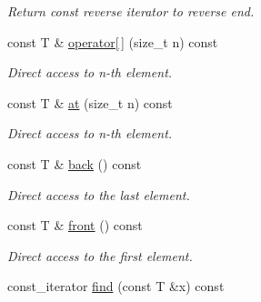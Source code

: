 \begin{DoxyCompactItemize}
\begin{DoxyCompactList}\small\item\em Return const reverse iterator to reverse end. \end{DoxyCompactList}\item 
\hypertarget{classmerlin_1_1set_a554ef509882e4d14cc0c8dd772eff7a9}{}const T \& \hyperlink{classmerlin_1_1set_a554ef509882e4d14cc0c8dd772eff7a9}{operator\mbox{[}$\,$\mbox{]}} (size\+\_\+t n) const \label{classmerlin_1_1set_a554ef509882e4d14cc0c8dd772eff7a9}

\begin{DoxyCompactList}\small\item\em Direct access to n-\/th element. \end{DoxyCompactList}\item 
\hypertarget{classmerlin_1_1set_af666381d39987a3a00787b0f1e7b9fb3}{}const T \& \hyperlink{classmerlin_1_1set_af666381d39987a3a00787b0f1e7b9fb3}{at} (size\+\_\+t n) const \label{classmerlin_1_1set_af666381d39987a3a00787b0f1e7b9fb3}

\begin{DoxyCompactList}\small\item\em Direct access to n-\/th element. \end{DoxyCompactList}\item 
\hypertarget{classmerlin_1_1set_af82e83415c527fcfeb58be6b52a90e50}{}const T \& \hyperlink{classmerlin_1_1set_af82e83415c527fcfeb58be6b52a90e50}{back} () const \label{classmerlin_1_1set_af82e83415c527fcfeb58be6b52a90e50}

\begin{DoxyCompactList}\small\item\em Direct access to the last element. \end{DoxyCompactList}\item 
\hypertarget{classmerlin_1_1set_af270bbb3466f328017c06624c134c927}{}const T \& \hyperlink{classmerlin_1_1set_af270bbb3466f328017c06624c134c927}{front} () const \label{classmerlin_1_1set_af270bbb3466f328017c06624c134c927}

\begin{DoxyCompactList}\small\item\em Direct access to the first element. \end{DoxyCompactList}\item 
\hypertarget{classmerlin_1_1set_a7006853510da98c34586a5fc07a43187}{}const\+\_\+iterator \hyperlink{classmerlin_1_1set_a7006853510da98c34586a5fc07a43187}{find} (const T \&x) const \label{classmerlin_1_1set_a7006853510da98c34586a5fc07a43187}


\end{DoxyCompactItemize}
